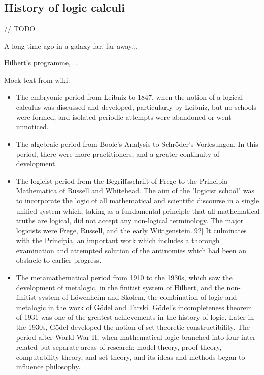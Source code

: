 \documentclass[article]{aaltoseries}
\begin{document}

\subsection{History of logic calculi}
\label{sec:history}
// TODO

A long time ago in a galaxy far, far away...

Hilbert's programme, ...

Mock text from wiki: %
\begin{itemize}
	
	\item The embryonic period from Leibniz to 1847, when the notion of a logical calculus was discussed and developed, particularly by Leibniz, but no schools were formed, and isolated periodic attempts were abandoned or went unnoticed.
	
	\item The algebraic period from Boole's Analysis to Schröder's Vorlesungen. In this period, there were more practitioners, and a greater continuity of development.
	
	\item The logicist period from the Begriffsschrift of Frege to the Principia Mathematica of Russell and Whitehead. The aim of the "logicist school" was to incorporate the logic of all mathematical and scientific discourse in a single unified system which, taking as a fundamental principle that all mathematical truths are logical, did not accept any non-logical terminology. The major logicists were Frege, Russell, and the early Wittgenstein.[92] It culminates with the Principia, an important work which includes a thorough examination and attempted solution of the antinomies which had been an obstacle to earlier progress.
	
	\item The metamathematical period from 1910 to the 1930s, which saw the development of metalogic, in the finitist system of Hilbert, and the non-finitist system of Löwenheim and Skolem, the combination of logic and metalogic in the work of Gödel and Tarski. Gödel's incompleteness theorem of 1931 was one of the greatest achievements in the history of logic. Later in the 1930s, Gödel developed the notion of set-theoretic constructibility.
	The period after World War II, when mathematical logic branched into four inter-related but separate areas of research: model theory, proof theory, computability theory, and set theory, and its ideas and methods began to influence philosophy.
	
\end{itemize}
\end{document}
